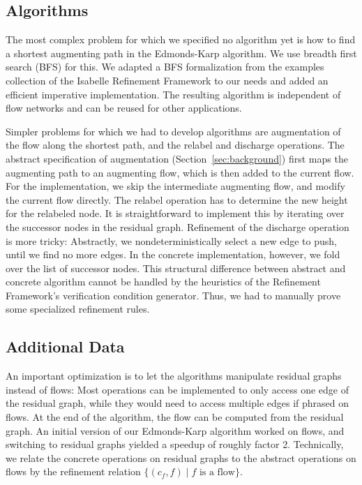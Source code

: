 \documentclass[smallcondensed]{svjour3}     %
\begin{document}
  \subsection{Algorithms}
  The most complex problem for which we specified no algorithm yet is how to find a shortest augmenting path in the Edmonds-Karp algorithm.
  We use breadth first search (BFS) for this. We adapted a BFS formalization from the examples collection of the Isabelle Refinement Framework to
  our needs and added an efficient imperative implementation. The resulting algorithm 
  is independent of flow networks and can be reused for other applications.
  
  Simpler problems for which we had to develop algorithms are augmentation of the flow along the shortest path, and the relabel and discharge operations.
  The abstract specification of augmentation (\cf Section~\ref{sec:background}) first maps the augmenting path to an augmenting flow, which is then added 
  to the current flow. For the implementation, we skip the intermediate augmenting flow, and modify the current flow directly.
  The relabel operation has to determine the new height for the relabeled node. It is straightforward to implement this by iterating over the 
  successor nodes in the residual graph. Refinement of the discharge operation is more tricky: Abstractly, we nondeterministically select a new edge to push, 
  until we find no more edges.
  In the concrete implementation, however, we fold over the list of successor nodes.
  This structural difference between abstract and concrete algorithm cannot be handled by the heuristics of the Refinement Framework's verification condition generator.
  Thus, we had to manually prove some specialized refinement rules.
  
  \subsection{Additional Data}\label{sec:impl_add_data}
  An important optimization is to let the algorithms manipulate residual graphs instead of flows: 
  Most operations can be implemented to only access one edge of the residual graph, while they would 
  need to access multiple edges if phrased on flows. At the end of the algorithm, the flow can be 
  computed from the residual graph. 
  An initial version of our Edmonds-Karp algorithm worked on flows, and switching to residual graphs yielded a speedup of roughly factor 2.
  Technically, we relate the concrete operations on residual graphs to the abstract operations on flows by the refinement 
  relation $\{(c_f,f) \mid \text{$f$ is a flow}\}$.
\end{document}
